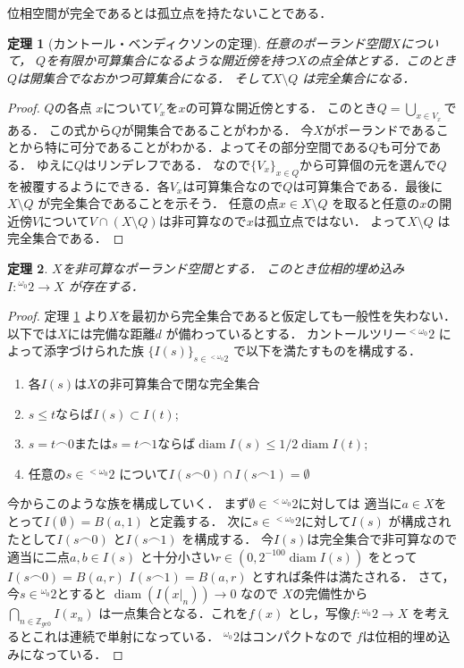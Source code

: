 \documentclass[leqno, 12pt]{jsarticle}
\newtheorem{thm}{定理}
\newcommand{\zz}{\mathbb{Z}}
\DeclareMathOperator{\di}{diam}
\newcommand{\myomega}{\omega_{0}}
\newcommand{\mycantor}{{}^{\myomega}2}
\newcommand{\mycantort}{{}^{<\myomega}2}
\newcommand{\myff}{\frown}
\begin{document}
位相空間が完全であるとは孤立点を持たないことである．
\begin{thm}[カントール・ベンディクソンの定理]
\label{thm:cantorbedixon}
任意のポーランド空間$X$について，
$Q$を有限か可算集合になるような開近傍を持つ$X$の点全体とする．このとき$Q$は開集合でなおかつ可算集合になる．
そして$X\setminus Q$
は完全集合になる．
\end{thm}
\begin{proof}
$Q$の各点
$x$について$V_{x}$を$x$の可算な開近傍とする．
このとき$Q=\bigcup_{x\in V_{x}}$である．
この式から$Q$が開集合であることがわかる．
今$X$がポーランドであることから特に可分であることがわかる．よってその部分空間である$Q$も可分である．
ゆえに$Q$はリンデレフである．
なので$\{V_{x}\}_{x\in Q}$から可算個の元を選んで$Q$を被覆するようにできる．各$V_{x}$は可算集合なので$Q$は可算集合である．最後に$X\setminus Q$
が完全集合であることを示そう．
任意の点$x\in X\setminus Q$
を取ると任意の$x$の開近傍$V$について$V\cap (X\setminus Q)$は非可算なので$x$は孤立点ではない．
よって$X\setminus Q$
は完全集合である．
\end{proof}

\begin{thm}\label{thm:ctoX}
$X$を非可算なポーランド空間とする．
このとき位相的埋め込み$I\colon \mycantor\to X$
が存在する．
\end{thm}
\begin{proof}
定理 \ref{thm:cantorbedixon}
より$X$を最初から完全集合であると仮定しても一般性を失わない．
以下では$X$には完備な距離$d$
が備わっているとする．
カントールツリー$\mycantort$
によって添字づけられた族
$\{I(s)\}_{s\in \mycantort}$
で以下を満たすものを構成する．
\begin{enumerate}
\item 
各$I(s)$は$X$の非可算集合で閉な完全集合
\item $s\le t$ならば$I(s)\subset I(t)$; 
\item $s=t\myff 0$または$s=t\myff 1$ならば$
\di I(s)\le 1/2\di I(t)$; 
\item 
任意の$s\in \mycantort$
について$I(s\myff 0)\cap I(s\myff 1)=\emptyset$

\end{enumerate}
今からこのような族を構成していく．
まず$\emptyset\in \mycantort$に対しては
適当に$a\in X$をとって$I(\emptyset)=B(a, 1)$
と定義する．
次に$s\in \mycantort$に対して$I(s)$
が構成されたとして$I(s\myff 0)$
と$I(s\myff 1)$
を構成する．
今$I(s)$は完全集合で非可算なので
適当に二点$a, b\in I(s)$
と十分小さい$r\in (0, 2^{-100}\di I(s))$
をとって$I(s\myff 0)=B(a, r)$
$I(s\myff 1)=B(a, r)$
とすれば条件は満たされる．
さて，
今$s\in \mycantor$とすると
$\di (I(x|_{n}))\to 0$
なので
$X$の完備性から
$\bigcap_{n\in \zz_{ge 0}} I(x_{n})$
は一点集合となる．これを$f(x)$
とし，写像$f\colon \mycantor\to X$
を考えるとこれは連続で単射になっている．
$\mycantor$はコンパクトなので
$f$は位相的埋め込みになっている．
\end{proof}
\end{document}
